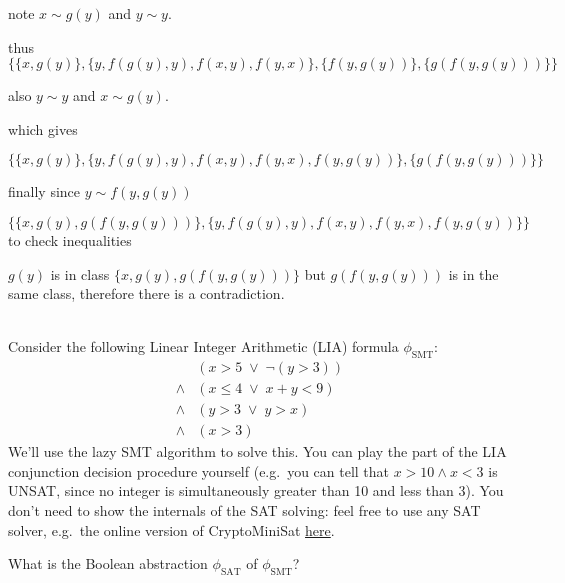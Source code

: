 \documentclass[11pt]{article}
\begin{document}
\begin{qunlist}
\begin{qparts}
\begin{answer}
      note  $x \sim g(y)$ and $y \sim y$.

      thus
      \begin{equation}
        \{\{x, g(y)\}, \{y, f(g(y), y), f(x,y), f(y,x)\}, \{f(y, g(y))\}, \{g(f(y, g(y)))\}\}
      \end{equation}


      also
      $y \sim y$ and $x \sim g(y)$.

      which gives

      \begin{equation}
        \{\{x, g(y)\}, \{y, f(g(y), y), f(x,y), f(y,x), f(y, g(y))\}, \{g(f(y, g(y)))\}\}
      \end{equation}

      finally since
      $y \sim f(y, g(y))$

      \begin{equation}
        \{\{x, g(y), g(f(y, g(y)))\}, \{y, f(g(y), y), f(x,y), f(y,x), f(y, g(y))\}\}
      \end{equation}
      to check inequalities

      $g(y)$ is in class $\{x, g(y), g(f(y, g(y)))\}$ but $g(f(y, g(y)))$ is in the same class, therefore there is a contradiction.
    \end{answer}
  \end{qparts}

  \\
  Consider the following Linear Integer Arithmetic (LIA) formula $\phi_{\text{SMT}}$:
  \begin{align*}
    &(x > 5 \;\lor\; \lnot (y > 3)) \\
    \land & (x \le 4 \;\lor\; x + y < 9) \\
    \land & (y > 3 \;\lor\; y > x) \\
    \land & (x > 3)
  \end{align*}
  We'll use the lazy SMT algorithm to solve this.
  You can play the part of the LIA conjunction decision procedure yourself (e.g.~you can tell that $x > 10 \land x < 3$ is UNSAT, since no integer is simultaneously greater than 10 and less than 3).
  You don't need to show the internals of the SAT solving: feel free to use any SAT solver, e.g.~the online version of CryptoMiniSat \href{https://msoos.github.io/cryptominisat_web/}{here}.
  \begin{qparts}
  \item
    What is the Boolean abstraction $\phi_{\text{SAT}}$ of $\phi_{\text{SMT}}$?


\end{qparts}
\end{qunlist}
\end{document}
